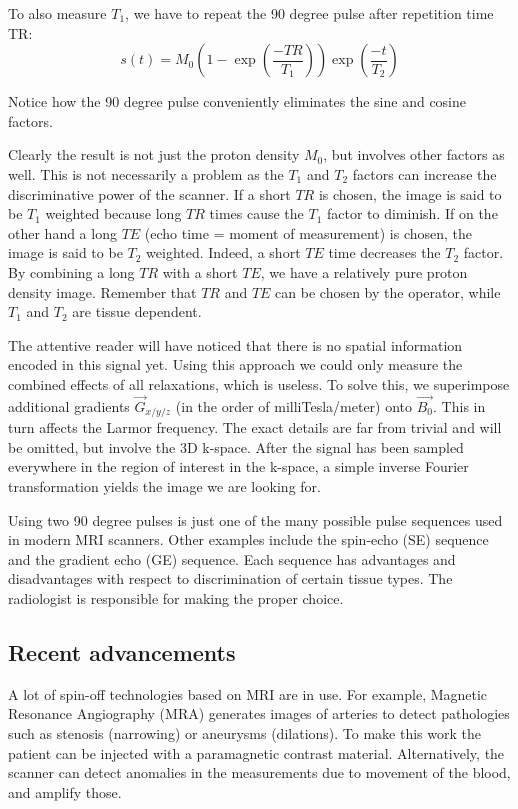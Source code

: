 To also measure $T_1$, we have to repeat the 90 degree pulse after repetition
time TR:
\begin{equation}
s(t) = M_0 \left(1 - \exp\left(\frac{-TR}{T_1}\right)\right)
\exp\left(\frac{-t}{T_2}\right)
\end{equation}

Notice how the 90 degree pulse conveniently eliminates the sine and cosine
factors.

Clearly the result is not just the proton density $M_0$, but involves other
factors as well. This is not necessarily a problem as the $T_1$ and $T_2$
factors can increase the discriminative power of the scanner. If a short $TR$ is
chosen, the image is said to be $T_1$ weighted because long $TR$ times cause the
$T_1$ factor to diminish. If on the other hand a long $TE$ (echo time = moment
of measurement) is chosen, the image is said to be $T_2$ weighted. Indeed, a
short $TE$ time decreases the $T_2$ factor. By combining a long $TR$ with a
short $TE$, we have a relatively pure proton density image. Remember that $TR$
and $TE$ can be chosen by the operator, while $T_1$ and $T_2$ are tissue
dependent.

The attentive reader will have noticed that there is no spatial information
encoded in this signal yet. Using this approach we could only measure the
combined effects of all relaxations, which is useless. To solve this, we
superimpose additional gradients $\vec{G}_{x/y/z}$ (in the order of
milliTesla/meter) onto $\vec{B_0}$. This in turn affects the Larmor frequency.
The exact details are far from trivial and will be omitted, but involve the
3D k-space. After the signal has been sampled everywhere in the region of
interest in the k-space, a simple inverse Fourier transformation yields the
image we are looking for.

Using two 90 degree pulses is just one of the many possible pulse sequences used
in modern MRI scanners. Other examples include the spin-echo (SE) sequence and
the gradient echo (GE) sequence. Each sequence has advantages and disadvantages
with respect to discrimination of certain tissue types. The radiologist is
responsible for making the proper choice.


\subsection{Recent advancements}
A lot of spin-off technologies based on MRI are in use. For example, Magnetic
Resonance Angiography (MRA) generates images of arteries to detect pathologies
such as stenosis (narrowing) or aneurysms (dilations). To make this work the
patient can be injected with a paramagnetic contrast material. Alternatively,
the scanner can detect anomalies in the measurements due to movement of the blood, and
amplify those.

